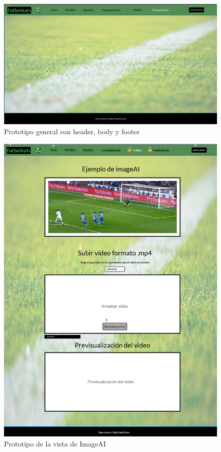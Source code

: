 \begin{figure}[H]
    \centering
    \includegraphics[width=0.7\linewidth]{img/prototipo3.png}
    \caption{Prototipo general con header, body y footer}
    \label{fig:enter-label}
\end{figure}

\begin{figure}[H]
    \centering
    \includegraphics[width=0.7\linewidth]{img/prototipo2.png}
    \caption{Prototipo de la vista de ImageAI}
    \label{fig:enter-label}
\end{figure}

